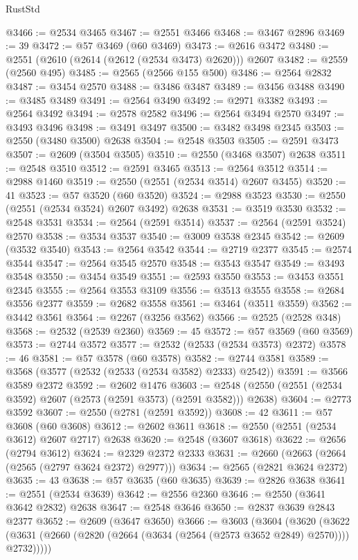 \begin{lexlean}{RustStd}
\begin{coremodule}
@3466 := @2534 @3465
@3467 := @2551 @3466
@3468 := @3467 @2896
@3469 := 39
@3472 := @57 @3469 (@60 @3469)
@3473 := @2616 @3472
@3480 := @2551 (@2610 (@2614 (@2612 (@2534 @3473) @2620))) @2607
@3482 := @2559 (@2560 @495)
@3485 := @2565 (@2566 @155 @500)
@3486 := @2564 @2832
@3487 := @3454 @2570
@3488 := @3486 @3487
@3489 := @3456 @3488
@3490 := @3485 @3489
@3491 := @2564 @3490
@3492 := @2971 @3382
@3493 := @2564 @3492
@3494 := @2578 @2582
@3496 := @2564 @3494 @2570
@3497 := @3493 @3496
@3498 := @3491 @3497
@3500 := @3482 @3498 @2345
@3503 := @2550 (@3480 @3500) @2638
@3504 := @2548 @3503
@3505 := @2591 @3473
@3507 := @2609 (@3504 @3505)
@3510 := @2550 (@3468 @3507) @2638
@3511 := @2548 @3510
@3512 := @2591 @3465
@3513 := @2564 @3512
@3514 := @2988 @1460
@3519 := @2550 (@2551 (@2534 @3514) @2607 @3455)
@3520 := 41
@3523 := @57 @3520 (@60 @3520)
@3524 := @2988 @3523
@3530 := @2550 (@2551 (@2534 @3524) @2607 @3492) @2638
@3531 := @3519 @3530
@3532 := @2548 @3531
@3534 := @2564 (@2591 @3514)
@3537 := @2564 (@2591 @3524) @2570
@3538 := @3534 @3537
@3540 := @3009 @3538 @2345
@3542 := @2609 (@3532 @3540)
@3543 := @2564 @3542
@3544 := @2719 @2377
@3545 := @2574 @3544
@3547 := @2564 @3545 @2570
@3548 := @3543 @3547
@3549 := @3493 @3548
@3550 := @3454 @3549
@3551 := @2593 @3550
@3553 := @3453 @3551 @2345
@3555 := @2564 @3553 @3109
@3556 := @3513 @3555
@3558 := @2684 @3556 @2377
@3559 := @2682 @3558
@3561 := @3464 (@3511 @3559)
@3562 := @3442 @3561
@3564 := @2267 (@3256 @3562)
@3566 := @2525 (@2528 @348)
@3568 := @2532 (@2539 @2360)
@3569 := 45
@3572 := @57 @3569 (@60 @3569)
@3573 := @2744 @3572
@3577 := @2532 (@2533 (@2534 @3573) @2372)
@3578 := 46
@3581 := @57 @3578 (@60 @3578)
@3582 := @2744 @3581
@3589 := @3568 (@3577 (@2532 (@2533 (@2534 @3582) @2333) @2542))
@3591 := @3566 @3589 @2372
@3592 := @2602 @1476
@3603 := @2548 (@2550 (@2551 (@2534 @3592) @2607 (@2573 (@2591 @3573) (@2591 @3582))) @2638)
@3604 := @2773 @3592
@3607 := @2550 (@2781 (@2591 @3592))
@3608 := 42
@3611 := @57 @3608 (@60 @3608)
@3612 := @2602 @3611
@3618 := @2550 (@2551 (@2534 @3612) @2607 @2717) @2638
@3620 := @2548 (@3607 @3618)
@3622 := @2656 (@2794 @3612)
@3624 := @2329 @2372 @2333
@3631 := @2660 (@2663 (@2664 (@2565 (@2797 @3624 @2372) @2977)))
@3634 := @2565 (@2821 @3624 @2372)
@3635 := 43
@3638 := @57 @3635 (@60 @3635)
@3639 := @2826 @3638
@3641 := @2551 (@2534 @3639)
@3642 := @2556 @2360
@3646 := @2550 (@3641 @3642 @2832) @2638
@3647 := @2548 @3646
@3650 := @2837 @3639 @2843 @2377
@3652 := @2609 (@3647 @3650)
@3666 := @3603
    (@3604
      (@3620
        (@3622 (@3631 (@2660 (@2820 (@2664 (@3634 (@2564 (@2573 @3652 @2849) @2570)))) @2732)))))

\end{coremodule}
\end{lexlean}
